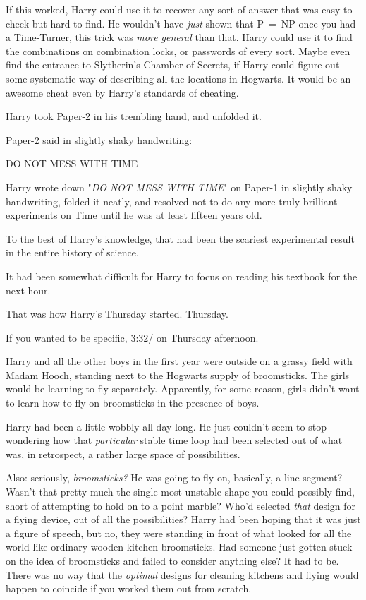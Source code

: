 If this worked, Harry could use it to recover any sort of answer that was easy
to check but hard to find. He wouldn't have \emph{just} shown that P~=~NP once
you had a Time-Turner, this trick was \emph{more general} than that. Harry
could use it to find the combinations on combination locks, or passwords of
every sort. Maybe even find the entrance to Slytherin's Chamber of Secrets, if
Harry could figure out some systematic way of describing all the locations in
Hogwarts. It would be an awesome cheat even by Harry's standards of cheating.

Harry took Paper-2 in his trembling hand, and unfolded it.

Paper-2 said in slightly shaky handwriting:

\begin{writtenNote}
DO NOT MESS WITH TIME
\end{writtenNote}

Harry wrote down "\emph{DO NOT MESS WITH TIME}" on Paper-1 in slightly shaky
handwriting, folded it neatly, and resolved not to do any more truly brilliant
experiments on Time until he was at least fifteen years old.

To the best of Harry's knowledge, that had been the scariest experimental
result in the entire history of science.

It had been somewhat difficult for Harry to focus on reading his textbook for
the next hour.

That was how Harry's Thursday started.
\sbreak
Thursday.

If you wanted to be specific, 3:32\PM/ on Thursday afternoon.

Harry and all the other boys in the first year were outside on a grassy field
with Madam Hooch, standing next to the Hogwarts supply of broomsticks. The
girls would be learning to fly separately. Apparently, for some reason, girls
didn't want to learn how to fly on broomsticks in the presence of boys.

Harry had been a little wobbly all day long. He just couldn't seem to stop
wondering how that \emph{particular} stable time loop had been selected out of
what was, in retrospect, a rather large space of possibilities.

Also: seriously, \emph{broomsticks?} He was going to fly on, basically, a line
segment? Wasn't that pretty much the single most unstable shape you could
possibly find, short of attempting to hold on to a point marble? Who'd selected
\emph{that} design for a flying device, out of all the possibilities? Harry had
been hoping that it was just a figure of speech, but no, they were standing in
front of what looked for all the world like ordinary wooden kitchen
broomsticks. Had someone just gotten stuck on the idea of broomsticks and
failed to consider anything else? It had to be. There was no way that the
\emph{optimal} designs for cleaning kitchens and flying would happen to
coincide if you worked them out from scratch.

